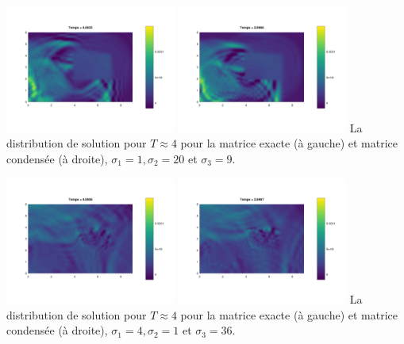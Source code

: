 \documentclass[12pt]{article}
\begin{document}
\begin{center}
	\hspace{1cm}\includegraphics[width=0.42\textwidth]{images/u_trois_mil_1_20_9}\hspace{1cm}
	\includegraphics[width=0.42\textwidth]{images/u_trois_mil_1_20_9_cond}\hspace{1cm}
	{La distribution de solution pour $T \approx 4$ pour la matrice exacte (à gauche) et matrice condensée (à droite), $\sigma_1 = 1, \sigma_2 = 20$ et $\sigma_3 = 9$.}
\end{center}
\begin{center}
	\hspace{1cm}\includegraphics[width=0.42\textwidth]{images/u_trois_mil_4_1_36}\hspace{1cm}
	\includegraphics[width=0.42\textwidth]{images/u_trois_mil_4_1_36_cond}\hspace{1cm}
	{La distribution de solution pour $T \approx 4$ pour la matrice exacte (à gauche) et matrice condensée (à droite), $\sigma_1 = 4, \sigma_2 = 1$ et $\sigma_3 = 36$.}
\end{center}
\end{document}
